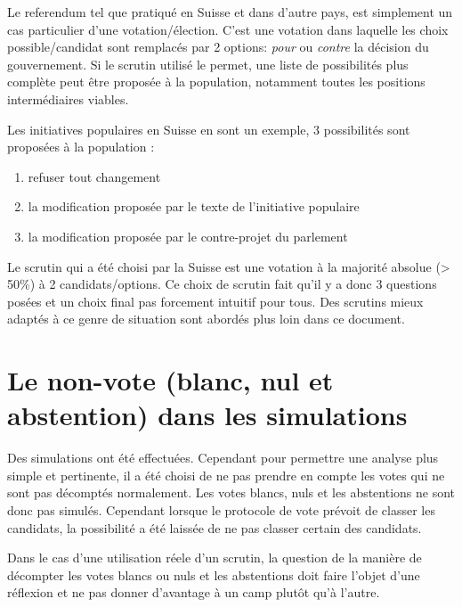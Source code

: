 \documentclass[../report]{subfiles}
\begin{document}
  Le referendum tel que pratiqué en Suisse et dans d'autre pays, est simplement un cas particulier d'une votation/élection. 
  C'est une votation dans laquelle les choix possible/candidat sont remplacés par 2 options: \emph{pour} ou \emph{contre} la décision
  du gouvernement.
  Si le scrutin utilisé le permet, une liste de possibilités plus complète peut être proposée à la population, notamment 
  toutes les positions intermédiaires viables. 
  
  Les initiatives populaires en Suisse en sont un exemple, 3 possibilités sont proposées à la population : 
  \begin{enumerate}
  	\item refuser tout changement
  	\item la modification proposée par le texte de l'initiative populaire
  	\item la modification proposée par le contre-projet du parlement
  \end{enumerate}
  
  Le scrutin qui a été choisi par la Suisse est une votation à la majorité absolue (> 50\%) à 2 candidats/options.
  Ce choix de scrutin fait qu'il y a donc 3 questions posées et un choix final pas forcement intuitif pour tous.
  Des scrutins mieux adaptés à ce genre de situation sont abordés plus loin dans ce document.
  
  
  \section[Le non-vote dans les simulations]{Le non-vote (blanc, nul et abstention) dans les simulations}
  
  Des simulations ont été effectuées. Cependant pour permettre une analyse plus simple et pertinente, il a été choisi de ne 
  pas prendre en compte les votes qui ne sont pas décomptés normalement.
  Les votes blancs, nuls et les abstentions ne sont donc pas simulés. Cependant lorsque le protocole de vote prévoit de 
  classer les candidats, la possibilité a été laissée de ne pas classer certain des candidats.
  
  Dans le cas d'une utilisation réele d'un scrutin, la question de la manière de décompter les votes blancs ou nuls et les abstentions 
  doit faire l'objet d'une réflexion et ne pas donner d'avantage à un camp plutôt qu'à l'autre.
  
\end{document}
